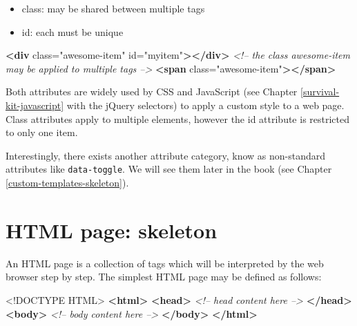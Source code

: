 \documentclass[]{book}
\newenvironment{Shaded}{\begin{snugshade}}{\end{snugshade}}
\newcommand{\CommentTok}[1]{\textcolor[rgb]{0.56,0.35,0.01}{\textit{#1}}}
\newcommand{\DataTypeTok}[1]{\textcolor[rgb]{0.13,0.29,0.53}{#1}}
\newcommand{\KeywordTok}[1]{\textcolor[rgb]{0.13,0.29,0.53}{\textbf{#1}}}
\newcommand{\NormalTok}[1]{#1}
\newcommand{\OtherTok}[1]{\textcolor[rgb]{0.56,0.35,0.01}{#1}}
\newcommand{\StringTok}[1]{\textcolor[rgb]{0.31,0.60,0.02}{#1}}
\providecommand{\tightlist}{%
  \setlength{\itemsep}{0pt}\setlength{\parskip}{0pt}}
\begin{document}
\begin{itemize}
\tightlist
\item
  class: may be shared between multiple tags
\item
  id: each must be unique
\end{itemize}

\begin{Shaded}
\begin{Highlighting}[]
\KeywordTok{<div}\OtherTok{ class=}\StringTok{"awesome-item"}\OtherTok{ id=}\StringTok{"myitem"}\KeywordTok{></div>}
\CommentTok{<!-- the class awesome-item may be applied to multiple tags -->}
\KeywordTok{<span}\OtherTok{ class=}\StringTok{"awesome-item"}\KeywordTok{></span>}
\end{Highlighting}
\end{Shaded}

Both attributes are widely used by CSS and JavaScript (see Chapter \ref{survival-kit-javascript} with the jQuery selectors) to apply a custom style to a web page. Class attributes apply to multiple elements, however the id attribute is restricted to only one item.

Interestingly, there exists another attribute category, know as non-standard attributes like \texttt{data-toggle}. We will see them later in the book (see Chapter \ref{custom-templates-skeleton}).

\hypertarget{html-page-skeleton}{%
\section{HTML page: skeleton}\label{html-page-skeleton}}

An HTML page is a collection of tags which will be interpreted by the web browser step by step. The simplest HTML page may be defined as follows:

\begin{Shaded}
\begin{Highlighting}[]
\DataTypeTok{<!DOCTYPE }\NormalTok{HTML}\DataTypeTok{>}
\KeywordTok{<html>}
  \KeywordTok{<head>}
  \CommentTok{<!-- head content here -->}
  \KeywordTok{</head>}
  \KeywordTok{<body>}
  \CommentTok{<!-- body content here -->}
  \KeywordTok{</body>}
\KeywordTok{</html>}
\end{Highlighting}
\end{Shaded}
\end{document}
